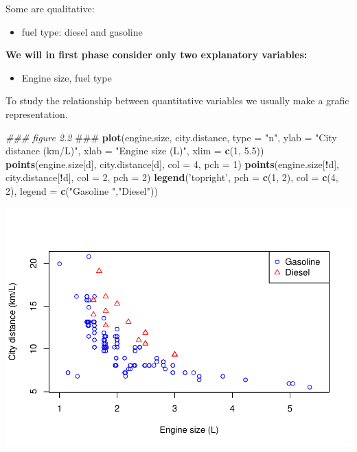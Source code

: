 \documentclass[
]{article}
\newenvironment{Shaded}{\begin{snugshade}}{\end{snugshade}}
\newcommand{\AlertTok}[1]{\textcolor[rgb]{0.94,0.16,0.16}{#1}}
\newcommand{\CommentTok}[1]{\textcolor[rgb]{0.56,0.35,0.01}{\textit{#1}}}
\newcommand{\DataTypeTok}[1]{\textcolor[rgb]{0.13,0.29,0.53}{#1}}
\newcommand{\DecValTok}[1]{\textcolor[rgb]{0.00,0.00,0.81}{#1}}
\newcommand{\FloatTok}[1]{\textcolor[rgb]{0.00,0.00,0.81}{#1}}
\newcommand{\KeywordTok}[1]{\textcolor[rgb]{0.13,0.29,0.53}{\textbf{#1}}}
\newcommand{\NormalTok}[1]{#1}
\newcommand{\OperatorTok}[1]{\textcolor[rgb]{0.81,0.36,0.00}{\textbf{#1}}}
\newcommand{\StringTok}[1]{\textcolor[rgb]{0.31,0.60,0.02}{#1}}
\providecommand{\tightlist}{%
  \setlength{\itemsep}{0pt}\setlength{\parskip}{0pt}}
\begin{document}
Some are qualitative:

\begin{itemize}
\tightlist
\item
  fuel type: diesel and gasoline
\end{itemize}

\textbf{We will in first phase consider only two explanatory variables:}

\begin{itemize}
\tightlist
\item
  Engine size, fuel type
\end{itemize}

To study the relationship between quantitative variables we usually make
a grafic representation.

\begin{Shaded}
\begin{Highlighting}[]
\CommentTok{### figure 2.2 }\AlertTok{###}
\KeywordTok{plot}\NormalTok{(engine.size, city.distance, }\DataTypeTok{type =} \StringTok{"n"}\NormalTok{, }\DataTypeTok{ylab =} \StringTok{"City distance (km/L)"}\NormalTok{,}
     \DataTypeTok{xlab =} \StringTok{"Engine size (L)"}\NormalTok{, }\DataTypeTok{xlim =} \KeywordTok{c}\NormalTok{(}\DecValTok{1}\NormalTok{, }\FloatTok{5.5}\NormalTok{))}
\KeywordTok{points}\NormalTok{(engine.size[d], city.distance[d], }\DataTypeTok{col =} \DecValTok{4}\NormalTok{, }\DataTypeTok{pch =} \DecValTok{1}\NormalTok{)}
\KeywordTok{points}\NormalTok{(engine.size[}\OperatorTok{!}\NormalTok{d], city.distance[}\OperatorTok{!}\NormalTok{d], }\DataTypeTok{col =} \DecValTok{2}\NormalTok{, }\DataTypeTok{pch =} \DecValTok{2}\NormalTok{)}
\KeywordTok{legend}\NormalTok{(}\StringTok{'topright'}\NormalTok{, }\DataTypeTok{pch =} \KeywordTok{c}\NormalTok{(}\DecValTok{1}\NormalTok{, }\DecValTok{2}\NormalTok{), }\DataTypeTok{col =} \KeywordTok{c}\NormalTok{(}\DecValTok{4}\NormalTok{, }\DecValTok{2}\NormalTok{),}
       \DataTypeTok{legend =} \KeywordTok{c}\NormalTok{(}\StringTok{"Gasoline  "}\NormalTok{,}\StringTok{"Diesel"}\NormalTok{))}
\end{Highlighting}
\end{Shaded}

\includegraphics{fromBook_files/figure-latex/unnamed-chunk-2-1.pdf}
\end{document}
